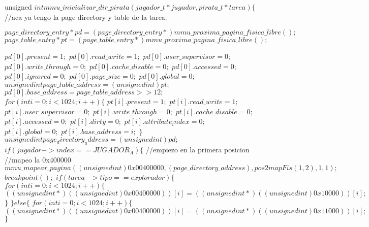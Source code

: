 \begin{algorithmic}
\State \tab unsigned $ int mmu\_inicializar\_dir\_pirata(jugador\_t* jugador, pirata\_t* tarea) \{$
  //aca ya tengo la page directory y table de la tarea.

\State \tab \tab  $ page\_directory\_entry* pd = (page\_directory\_entry*) mmu\_proxima\_pagina\_fisica\_libre();$
\State \tab \tab  $ page\_table\_entry* pt = (page\_table\_entry*) mmu\_proxima\_pagina\_fisica\_libre();$

\State \tab \tab  $ pd[0].present = 1;$
\State \tab \tab  $ pd[0].read\_write = 1;$
\State \tab \tab  $ pd[0].user\_supervisor = 0;$
\State \tab \tab  $ pd[0].write\_through = 0;$
\State \tab \tab  $ pd[0].cache\_disable = 0;$
\State \tab \tab  $ pd[0].accessed = 0;$
\State \tab \tab  $ pd[0].ignored = 0;$
\State \tab \tab  $ pd[0].page\_size = 0;$
\State \tab \tab  $ pd[0].global = 0;$
\State \tab \tab  $ unsigned int page\_table\_address = (unsigned int)pt;$
\State \tab \tab  $ pd[0].base\_address = page\_table\_address >> 12;$
\State \tab \tab  $ for (int i = 0; i < 1024; i++) \{$
 \State \tab \tab \tab $    pt[i].present = 1;$
 \State \tab \tab \tab $    pt[i].read\_write = 1;$
 \State \tab \tab \tab $    pt[i].user\_supervisor = 0;$
 \State \tab \tab \tab $    pt[i].write\_through = 0;$
 \State \tab \tab \tab $    pt[i].cache\_disable = 0;$
 \State \tab \tab \tab $    pt[i].accessed = 0;$
 \State \tab \tab \tab $    pt[i].dirty = 0;$
 \State \tab \tab \tab $    pt[i].attribute_index = 0;$
 \State \tab \tab \tab $    pt[i].global = 0;$
 \State \tab \tab \tab $   pt[i].base\_address = i;$
\State \tab \tab $  \}$
\State \tab \tab  $ unsigned int page_directory_address = (unsigned int)pd;$
\State \tab \tab  $ if (jugador->index == JUGADOR_A) \{$
    //empiezo en la primera posicion
    //mapeo la 0x400000
  \State \tab \tab \tab $   mmu\_mapear\_pagina((unsigned int)0x00400000, (page\_directory\_address), pos2mapFis(1,2), 1, 1);$
  \State \tab \tab \tab $   breakpoint();$
  \State \tab \tab \tab $   if (tarea->tipo == explorador) \{$
      \State \tab \tab \tab \tab $ for (int i = 0; i < 1024; i++) \{$
        \State \tab \tab \tab \tab \tab $ ((unsigned int*)((unsigned int)0x00400000))[i] = ((unsigned int*)((unsigned int)0x10000))[i];$
      \State \tab \tab \tab \tab $ \}$
   \State \tab \tab \tab $  \} else \{$
      \State \tab \tab \tab \tab $ for (int i = 0; i < 1024; i++) \{$
        \State \tab \tab \tab \tab \tab $ ((unsigned int*)((unsigned int)0x00400000))[i] = ((unsigned int*)((unsigned int)0x11000))[i];$
      \State \tab \tab \tab \tab $ \}$

\end{algorithmic}
